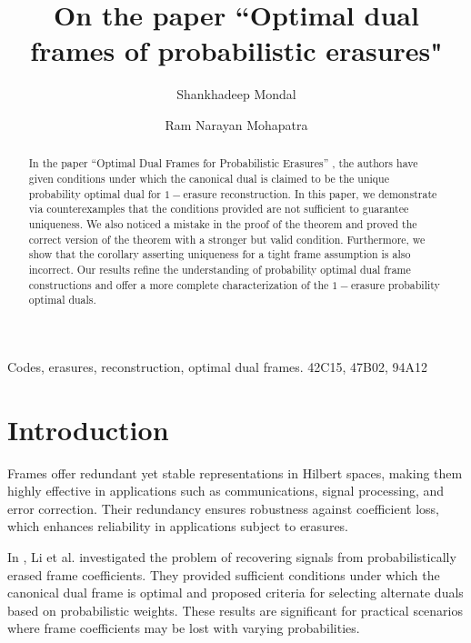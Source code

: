 \documentclass[final,1p,times]{elsarticle}
\begin{document}
	\begin{frontmatter}
	\title{On the paper  “Optimal dual frames of probabilistic erasures" }
        \author{Shankhadeep Mondal}
		\author{Ram Narayan Mohapatra}
		
		
		
		\address{University of Central Florida}
		
		

\begin{abstract}
In the paper “Optimal Dual Frames for Probabilistic Erasures” \cite{li1}, the authors have given conditions under which the canonical dual is claimed to be the unique probability optimal dual for $1-$erasure reconstruction. In this paper, we demonstrate via counterexamples that the conditions provided are not sufficient to guarantee uniqueness. We also noticed a mistake in the proof of the theorem and proved the correct version of the theorem with a stronger but valid condition. Furthermore, we show that the corollary asserting uniqueness for a tight frame assumption is also incorrect. Our results refine the understanding of probability optimal dual frame constructions and offer a more complete characterization of the $1-$erasure probability optimal duals.
\end{abstract}

		
		
		
		
		
		
		\begin{keyword}
			Codes, erasures, reconstruction, optimal dual frames.
			\MSC[2010] 42C15, 47B02, 94A12
		\end{keyword}
		
	\end{frontmatter}
	
\section{Introduction}


Frames offer redundant yet stable representations in Hilbert spaces, making them highly effective in applications such as communications, signal processing, and error correction. Their redundancy ensures robustness against coefficient loss, which enhances reliability in applications subject to erasures. 

In \cite{li1}, Li et al. investigated the problem of recovering signals from probabilistically erased frame coefficients. They provided sufficient conditions under which the canonical dual frame is optimal and proposed criteria for selecting alternate duals based on probabilistic weights. These results are significant for practical scenarios where frame coefficients may be lost with varying probabilities.
\end{document}
